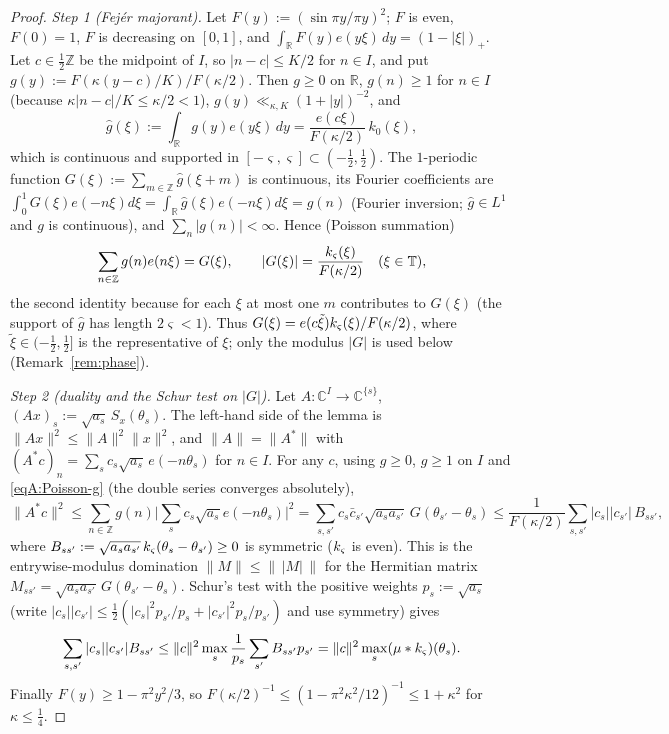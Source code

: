 \begin{proof}
\emph{Step 1 (Fej\'er majorant).} Let $F(y):=(\sin\pi y/\pi y)^2$; $F$ is even, $F(0)=1$, $F$ is
decreasing on $[0,1]$, and $\int_{\mathbb R}F(y)e(y\xi)\,dy=(1-|\xi|)_+$. Let $c\in\tfrac12\mathbb Z$ be the midpoint
of $I$, so $|n-c|\le K/2$ for $n\in I$, and put $g(y):=F(\kappa(y-c)/K)/F(\kappa/2)$. Then $g\ge0$ on
$\mathbb R$, $g(n)\ge1$ for $n\in I$ (because $\kappa|n-c|/K\le\kappa/2<1$), $g(y)\ll_{\kappa,K}(1+|y|)^{-2}$, and
\[
 \hat g(\xi):=\int_{\mathbb R}g(y)e(y\xi)\,dy=\frac{e(c\xi)}{F(\kappa/2)}\,k_0(\xi),
\]
which is continuous and supported in $[-\varsigma,\varsigma]\subset(-\tfrac12,\tfrac12)$. The $1$-periodic function
$G(\xi):=\sum_{m\in\mathbb Z}\hat g(\xi+m)$ is continuous, its Fourier coefficients are
$\int_0^1G(\xi)e(-n\xi)d\xi=\int_{\mathbb R}\hat g(\xi)e(-n\xi)d\xi=g(n)$ (Fourier inversion; $\hat g\in L^1$ and $g$ is
continuous), and $\sum_n|g(n)|<\infty$. Hence (Poisson summation)
\begin{equation}\label{eqA:Poisson-g}
 \sum_{n\in\mathbb Z}g(n)e(n\xi)=G(\xi),\qquad |G(\xi)|=\frac{k_{\varsigma}(\xi)}{F(\kappa/2)}\quad(\xi\in\mathbb{T}),
\end{equation}
the second identity because for each $\xi$ at most one $m$ contributes to $G(\xi)$ (the support of $\hat g$ has
length $2\varsigma<1$). Thus $G(\xi)=e(c\tilde\xi)k_{\varsigma}(\xi)/F(\kappa/2)$, where $\tilde\xi\in(-\frac12,\frac12]$ is the representative
of $\xi$; only the modulus $|G|$ is used below (Remark~\ref{rem:phase}).

\emph{Step 2 (duality and the Schur test on $|G|$).} Let $A:\mathbb C^I\to\mathbb C^{\{s\}}$,
$(Ax)_s:=\sqrt{a_s}\,S_x(\theta_s)$. The left-hand side of the lemma is $\|Ax\|^2\le\|A\|^2\|x\|^2$, and
$\|A\|=\|A^*\|$ with $(A^*c)_n=\sum_sc_s\sqrt{a_s}\,e(-n\theta_s)$ for $n\in I$. For any $c$,
using $g\ge0$, $g\ge1$ on $I$ and \eqref{eqA:Poisson-g} (the double series converges absolutely),
\[
 \|A^*c\|^2\le\sum_{n\in\mathbb Z}g(n)\Big|\sum_sc_s\sqrt{a_s}e(-n\theta_s)\Big|^2
 =\sum_{s,s'}c_s\bar c_{s'}\sqrt{a_sa_{s'}}\,G(\theta_{s'}-\theta_s)
 \le\frac1{F(\kappa/2)}\sum_{s,s'}|c_s||c_{s'}|\,B_{ss'},
\]
where $B_{ss'}:=\sqrt{a_sa_{s'}}\,k_{\varsigma}(\theta_s-\theta_{s'})\ge0$ is symmetric ($k_{\varsigma}$ is even). This is the
entrywise-modulus domination $\|M\|\le\|\,|M|\,\|$ for the Hermitian matrix $M_{ss'}=\sqrt{a_sa_{s'}}\,G(\theta_{s'}-\theta_s)$.
Schur's test with the positive weights $p_s:=\sqrt{a_s}$ (write
$|c_s||c_{s'}|\le\frac12(|c_s|^2p_{s'}/p_s+|c_{s'}|^2p_s/p_{s'})$ and use symmetry) gives
\[
 \sum_{s,s'}|c_s||c_{s'}|B_{ss'}\le\|c\|^2\max_s\frac1{p_s}\sum_{s'}B_{ss'}p_{s'}=\|c\|^2\max_s(\mu*k_{\varsigma})(\theta_s).
\]
Finally $F(y)\ge1-\pi^2y^2/3$, so $F(\kappa/2)^{-1}\le(1-\pi^2\kappa^2/12)^{-1}\le1+\kappa^2$ for $\kappa\le\frac14$.
\end{proof}

